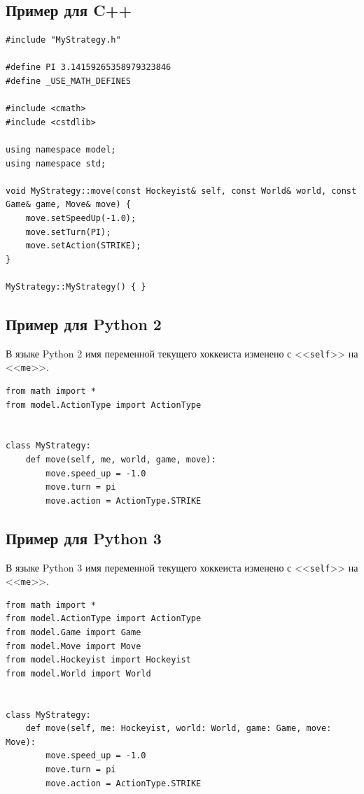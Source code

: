 \subsection{Пример для C++}

\begin{verbatim}
#include "MyStrategy.h"

#define PI 3.14159265358979323846
#define _USE_MATH_DEFINES

#include <cmath>
#include <cstdlib>

using namespace model;
using namespace std;

void MyStrategy::move(const Hockeyist& self, const World& world, const Game& game, Move& move) {
    move.setSpeedUp(-1.0);
    move.setTurn(PI);
    move.setAction(STRIKE);
}

MyStrategy::MyStrategy() { }
\end{verbatim}

\subsection{Пример для Python 2}

В языке Python 2 имя переменной текущего хоккеиста изменено с <<\texttt{self}>> на <<\texttt{me}>>.

\begin{verbatim}
from math import *
from model.ActionType import ActionType


class MyStrategy:
    def move(self, me, world, game, move):
        move.speed_up = -1.0
        move.turn = pi
        move.action = ActionType.STRIKE
\end{verbatim}

\subsection{Пример для Python 3}

В языке Python 3 имя переменной текущего хоккеиста изменено с <<\texttt{self}>> на <<\texttt{me}>>.

\begin{verbatim}
from math import *
from model.ActionType import ActionType
from model.Game import Game
from model.Move import Move
from model.Hockeyist import Hockeyist
from model.World import World


class MyStrategy:
    def move(self, me: Hockeyist, world: World, game: Game, move: Move):
        move.speed_up = -1.0
        move.turn = pi
        move.action = ActionType.STRIKE
\end{verbatim}

